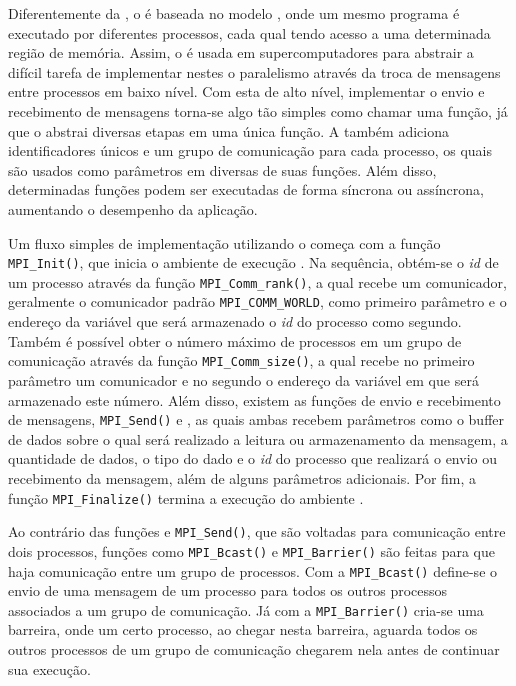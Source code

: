 Diferentemente da \OpenMP, o \MPI é baseada no modelo \SPMD, onde um mesmo programa é executado por diferentes processos, cada qual tendo acesso a uma determinada região de memória. Assim, o \MPI é usada em supercomputadores para abstrair a difícil tarefa de implementar nestes o paralelismo através da troca de mensagens entre processos em baixo nível. Com esta \API de alto nível, implementar o envio e recebimento de mensagens torna-se algo tão simples como chamar uma função, já que o \MPI abstrai diversas etapas em uma única função. A \API também adiciona identificadores únicos e um grupo de comunicação para cada processo, os quais são usados como parâmetros em diversas de suas funções. Além disso, determinadas funções podem ser executadas de forma síncrona ou assíncrona, aumentando o desempenho da aplicação.

Um fluxo simples de implementação utilizando o \MPI começa com a função \texttt{MPI\_Init()}, que inicia o ambiente de execução \MPI. Na sequência, obtém-se o \textit{id} de um processo através da função \texttt{MPI\_Comm\_rank()}, a qual recebe um comunicador, geralmente o comunicador padrão \texttt{MPI\_COMM\_WORLD}, como primeiro parâmetro e o endereço da variável que será armazenado o \textit{id} do processo como segundo. Também é possível obter o número máximo de processos em um grupo de comunicação através da função \texttt{MPI\_Comm\_size()}, a qual recebe no primeiro parâmetro um comunicador e no segundo o endereço da variável em que será armazenado este número. Além disso, existem as funções de envio e recebimento de mensagens, \texttt{MPI\_Send()} e , as quais ambas recebem parâmetros como o buffer de dados sobre o qual será realizado a leitura ou armazenamento da mensagem, a quantidade de dados, o tipo do dado e o \textit{id} do processo que realizará o envio ou recebimento da mensagem, além de alguns parâmetros adicionais. Por fim, a função \texttt{MPI\_Finalize()} termina a execução do ambiente \MPI.

Ao contrário das funções  e \texttt{MPI\_Send()}, que são voltadas para comunicação entre dois processos, funções como \texttt{MPI\_Bcast()} e \texttt{MPI\_Barrier()} são feitas para que haja comunicação entre um grupo de processos. Com a \texttt{MPI\_Bcast()} define-se o envio de uma mensagem de um processo para todos os outros processos associados a um grupo de comunicação. Já com a \texttt{MPI\_Barrier()} cria-se uma barreira, onde um certo processo, ao chegar nesta barreira, aguarda todos os outros processos de um grupo de comunicação chegarem nela antes de continuar sua execução.

